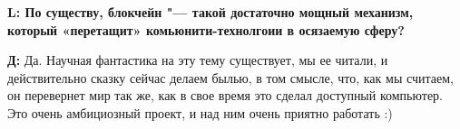 \documentclass[10pt, a5paper]{article}
\begin{document}
{\noindent \bf L: По существу, блокчейн "--- такой достаточно мощный механизм, который «перетащит» комьюнити-технолгоии в \linebreak осязаемую сферу?}

{\noindent \bf Д:} Да. Научная фантастика на эту тему существует, мы ее читали, и действительно сказку сейчас делаем былью, в том смысле, что, как мы  считаем, он перевернет мир так же, как в свое время это сделал доступный компьютер. Это очень амбициозный проект, и над ним очень приятно работать :)

 
\end{document}
